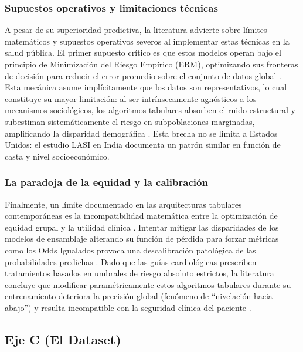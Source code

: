 \documentclass[conference]{IEEEtran}
\begin{document}
\subsubsection{Supuestos operativos y limitaciones técnicas}

A pesar de su superioridad predictiva, la literatura advierte sobre límites matemáticos y supuestos operativos severos al implementar estas técnicas en la salud pública. El primer supuesto crítico es que estos modelos operan bajo el principio de Minimización del Riesgo Empírico (ERM), optimizando sus fronteras de decisión para reducir el error promedio sobre el conjunto de datos global \cite{pfohl2021empirical}. Esta mecánica asume implícitamente que los datos son representativos, lo cual constituye su mayor limitación: al ser intrínsecamente agnósticos a los mecanismos sociológicos, los algoritmos tabulares absorben el ruido estructural y subestiman sistemáticamente el riesgo en subpoblaciones marginadas, amplificando la disparidad demográfica \cite{pfohl2022comparison}. Esta brecha no se limita a Estados Unidos: el estudio LASI en India \cite{lee2025evaluating} documenta un patrón similar en función de casta y nivel socioeconómico.

\subsubsection{La paradoja de la equidad y la calibración}

Finalmente, un límite documentado en las arquitecturas tabulares contemporáneas es la incompatibilidad matemática entre la optimización de equidad grupal y la utilidad clínica \cite{foryciarz2022evaluating}. Intentar mitigar las disparidades de los modelos de ensamblaje alterando su función de pérdida para forzar métricas como los Odds Igualados provoca una descalibración patológica de las probabilidades predichas \cite{foryciarz2022evaluating}. Dado que las guías cardiológicas prescriben tratamientos basados en umbrales de riesgo absoluto estrictos, la literatura concluye que modificar paramétricamente estos algoritmos tabulares durante su entrenamiento deteriora la precisión global (fenómeno de ``nivelación hacia abajo'') y resulta incompatible con la seguridad clínica del paciente \cite{pfohl2021empirical, foryciarz2022evaluating}.

\subsection{Eje C (El Dataset)}
\end{document}
